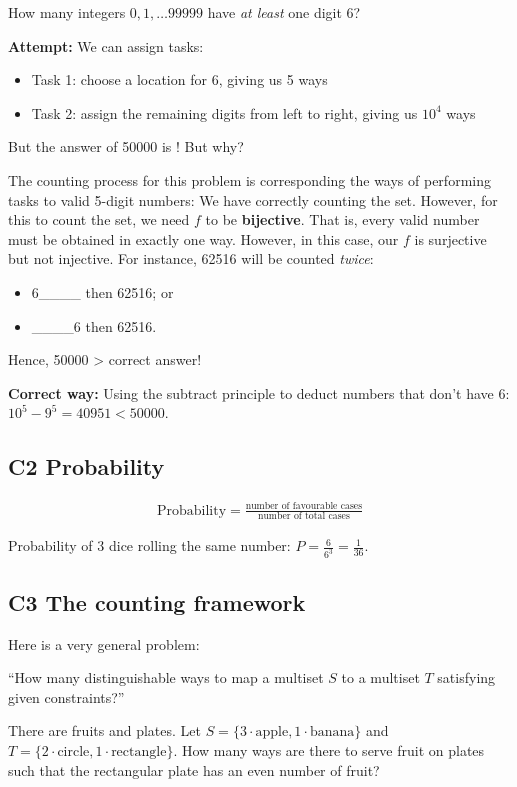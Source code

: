 \documentclass[12pt]{article}
\begin{document}
\noneg How many integers $0,1,\dots 99999$ have \textit{at least} one digit 6?

\textbf{Attempt:} We can assign tasks:\begin{itemize}
    \item Task 1: choose a location for 6, giving us 5 ways
    \item Task 2: assign the remaining digits from left to right, giving us $10^4$ ways
\end{itemize}

But the answer of 50000 is ! But why?

The counting process for this problem is corresponding the ways of performing tasks to valid 5-digit numbers:
We have correctly counting the  set. However, for this to count the  set, we need $f$ to be \textbf{bijective}. That is, every valid number must be obtained in exactly one way. However, in this case, our $f$ is surjective but not injective. For instance, 62516 will be counted \textit{twice}:\begin{itemize}
    \item 6\_\_\_\_ then 62516; or
    \item \_\_\_\_6 then 62516.
\end{itemize}
Hence, 50000 > correct answer!

\textbf{Correct way:} Using the subtract principle to deduct numbers that don't have 6: $10^5-9^5=40951<50000$.

\subsection{C2 Probability}
 \begin{align*}
    \text{Probability} = \frac{\text{number of favourable cases}}{\text{number of total cases}}
\end{align*}

\eg Probability of 3 dice rolling the same number: $P=\frac{6}{6^3}=\frac{1}{36}$.

\subsection{C3 The counting framework}
Here is a very general problem:

``How many distinguishable ways to map a multiset $S$ to a multiset $T$ satisfying given constraints?''

\eg There are fruits and plates. Let $S=\{3\cdot \text{apple}, 1\cdot \text{banana}\}$ and $T=\{2\cdot \text{circle}, 1\cdot \text{rectangle}\}$. How many ways are there to serve fruit on plates such that the rectangular plate has an even number of fruit?
\end{document}
